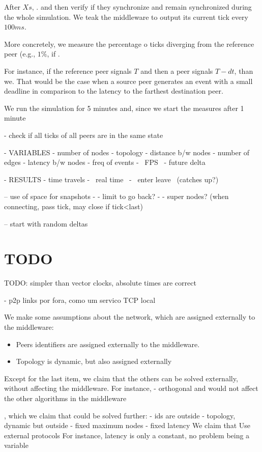\documentclass[10pt,journal,compsoc]{IEEEtran}
\begin{document}
After $Xs$, .
and then verify if they synchronize and remain synchronized during the whole
simulation.
We teak the middleware to output its current tick every $100ms$.

More concretely, we measure the percentage o ticks diverging from the reference
peer (e.g., $1\%$, if .

For instance, if the reference peer signals $T$ and then a peer signals $T-dt$,
than we.
That would be the case when a source peer generates an event with a small
deadline in comparison to the latency to the farthest destination peer.

We run the simulation for 5 minutes and, since we start the measures after 1 minute

- check if all ticks of all peers are in the same state

- VARIABLES
- number of nodes
- topology
    - distance b/w nodes
    - number of edges
- latency b/w nodes
- freq of events
- ~FPS~
- future delta

- RESULTS
- time travels
- ~real time~
- ~enter leave~ (catches up?)

-- use of space for snapshots
-    - limit to go back?
-    - super nodes? (when connecting, pass tick, may close if tick<last)

-- start with random deltas
\section{TODO}

TODO: simpler than vector clocks, absolute times are correct

- p2p links por fora, como um servico TCP local

We make some assumptions about the network, which are assigned externally to
the middleware:
%
\begin{itemize}
\item Peers identifiers are assigned externally to the middleware.
\item Topology is dynamic, but also assigned externally

\end{itemize}
%
Except for the last item, we claim that the others can be solved externally,
without affecting the middleware.
For instance,
- orthogonal and would not affect the other algorithms in the middleware

, which we claim that could be
solved further:
- ids are outside
- topology, dynamic but outside
- fixed maximum nodes
- fixed latency
We claim that Use external protocols
For instance, latency is only a constant, no problem being a variable
\end{document}
